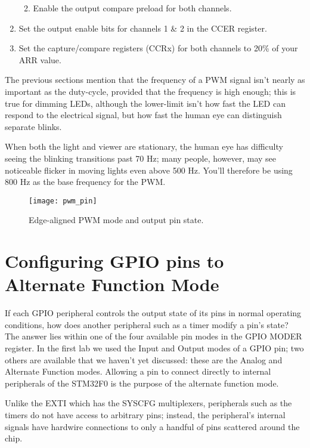 \documentclass[openany,11pt,fleqn]{book} %
\begin{document}
\begin{exercise}
\begin{enumerate}
\begin{enumerate}
\begin{itemize}
            \end{itemize}
            \item Enable the output compare preload for both channels.
        \end{enumerate}
        \item Set the output enable bits for channels 1 \& 2 in the CCER register.
        \item Set the capture/compare registers (CCRx) for both channels to 20\% of your ARR value.
    \end{enumerate}
\noindent The previous sections mention that the frequency of a PWM signal isn't nearly as important as the duty-cycle, provided that the frequency is high enough; this is true for dimming LEDs, although the lower-limit isn't how fast the LED can respond to the electrical signal, but how fast the human eye can distinguish separate blinks.

When both the light and viewer are stationary, the human eye has difficulty seeing the blinking transitions past 70 Hz; many people, however, may see noticeable flicker in moving lights even above 500 Hz. You'll therefore be using 800 Hz as the base frequency for the PWM. 

\end{exercise}

     \begin{figure}[!b]
    \centering\texttt{[image: pwm\_pin]}
    \caption{Edge-aligned PWM mode and output pin state.}
    \label{pwm_pin}
\end{figure}

\section{Configuring GPIO pins to Alternate Function Mode} \label{alternate_mode}

If each GPIO peripheral controls the output state of its pins in normal operating conditions, how does another peripheral such as a timer modify a pin's state? The answer lies within one of the four available pin modes in the GPIO MODER register. In the first lab we used the Input and Output modes of a GPIO pin; two others are available that we haven't yet discussed: these are the Analog and Alternate Function modes. Allowing a pin to connect directly to internal peripherals of the STM32F0 is the purpose of the alternate function mode. 

Unlike the EXTI which has the SYSCFG multiplexers, peripherals such as the timers do not have access to arbitrary pins; instead, the peripheral's internal signals have hardwire connections to only a handful of pins scattered around the chip. 
\end{document}
